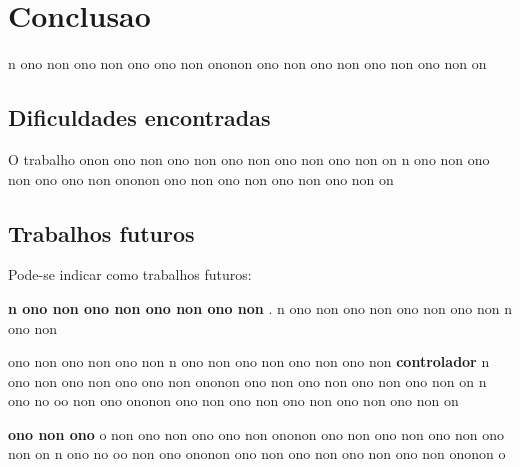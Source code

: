 \chapter{Conclusao}

n ono non ono non ono ono non ononon ono non ono non ono non ono non on
 

\section{Dificuldades encontradas}

O trabalho onon ono non ono non ono non ono non ono non on
n ono non ono non ono ono non ononon ono non ono non ono non ono non on

\section{Trabalhos futuros}

Pode-se indicar como trabalhos futuros:

\textbf{n ono non ono non ono non ono non }.
n ono non ono non ono non ono non n ono non 

ono non ono non ono non n ono non ono non ono non ono non 
\textbf{controlador} n ono non ono non ono ono non ononon ono non ono non ono non ono non on
n ono no oo non ono ononon ono  non ono non ono non ono non ono non on

\textbf{ono non ono}
o non ono non ono ono non ononon ono non ono non ono non ono non on
n ono no oo non ono ononon ono  non ono non ono non ono non ononon o 



